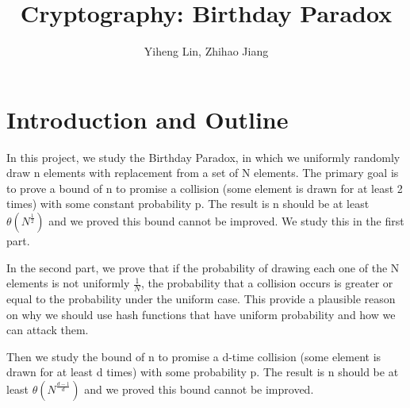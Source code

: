 \documentclass{article}
\title{\textmd{\bf Cryptography: Birthday Paradox}}
\date{}
\author{Yiheng Lin, Zhihao Jiang}
\begin{document}
    \begin{spacing}{1.1}
    \maketitle %

    
    \section*{Introduction and Outline}
    In this project, we study the Birthday Paradox, in which we uniformly randomly draw n elements with replacement from a set of N elements. The primary goal is to prove a bound of n to promise a collision (some element is drawn for at least 2 times) with some constant probability p. The result is n should be at least $\theta(N^{\frac{1}{2}})$ and we proved this bound cannot be improved. We study this in the first part.

    In the second part, we prove that if the probability of drawing each one of the N elements is not uniformly $\frac{1}{N}$, the probability that a collision occurs is greater or equal to the probability under the uniform case. This provide a plausible reason on why we should use hash functions that have uniform probability and how we can attack them.
    
    Then we study the bound of n to promise a d-time collision (some element is drawn for at least d times) with some probability p. The result is n should be at least $\theta(N^{\frac{d-1}{d}})$ and we proved this bound cannot be improved.
    \section{}

\end{spacing}
\end{document}
